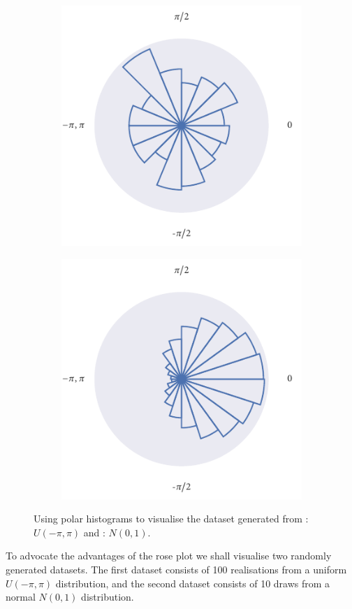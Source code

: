 \begin{figure}
	\begin{subfigure}[b]{0.45\textwidth}
		\includegraphics{unif_angle_rose.pdf}
		\caption{}
		\label{subfig:unif_angle_rose}
	\end{subfigure}%
	\hspace{0.05\textwidth}%
	\begin{subfigure}[b]{0.45\textwidth}
		\includegraphics{norm_angle_rose.pdf}
		\caption{}
		\label{subfig:norm_angle_rose}
	\end{subfigure}
	\caption{Using polar histograms to visualise the dataset generated from 
: $U(-\pi,\pi)$ and : $N(0, 1)$.}
	\label{fig:angle_rose}
\end{figure}
To advocate the advantages of the rose plot we shall visualise two randomly generated datasets. The 
first dataset consists of 100 realisations from a uniform $U(-\pi,\pi)$ distribution, and the second 
dataset consists of 10 draws from a normal $N(0, 1)$ distribution.


